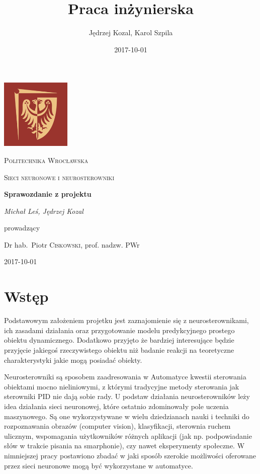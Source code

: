\documentclass{article}
\title{Praca inżynierska}
\date{2017-10-01}
\author{Jędrzej Kozal, Karol Szpila}
\begin{document}
\begin{titlepage}
	\centering
	\includegraphics[width=0.25\textwidth]{logo_pol_wroclaw.png}\par\vspace{1cm}
	{\scshape\LARGE Politechnika Wrocławska \par}
	\vspace{1cm}
	{\scshape\Large Sieci neuronowe i neurosterowniki \par}
	\vspace{1.5cm}
	{\huge\bfseries Sprawozdanie z projektu \par}
	\vspace{2cm}
	{\Large\itshape Michał Leś, Jędrzej Kozal\par}
	\vfill
	prowadzący\par
	Dr hab.~Piotr \textsc{Ciskowski}, prof. nadzw. PWr

	\vfill

	{\large 2017-10-01\par}
\end{titlepage}

\section{Wstęp}
Podstawowym założeniem projetku jest zaznajomienie się z neurosterownikami, ich zasadami działania oraz przygotowanie modelu predykcyjnego prostego obiektu dynamicznego. Dodatkowo przyjęto że bardziej interesujące będzie przyjęcie jakiegoś rzeczywistego obiektu niż badanie reakcji na teoretyczne charakterystyki jakie mogą posiadać obiekty.

Neurosterowniki są sposobem zaadresowania w Automatyce kwestii sterowania obiektami mocno nieliniowymi, z którymi tradycyjne metody sterowania jak sterowniki PID nie dają sobie rady. U podstaw działania neurosterowników leży idea działania sieci neuronowej, które ostatnio zdominowały pole uczenia maszynowego. Są one wykorzystywane w wielu dziedzianach nauki i techniki do rozpoznawania obrazów (computer vision), klasyfikacji, sterownia ruchem ulicznym, wspomagania użytkowników różnych aplikacji (jak np. podpowiadanie słów w trakcie pisania na smarphonie), czy nawet eksperymenty społeczne. W nimniejszej pracy postawiono zbadać w jaki sposób szerokie możliwości oferowane przez sieci neuronowe mogą być wykorzystane w automatyce.
\end{document}
